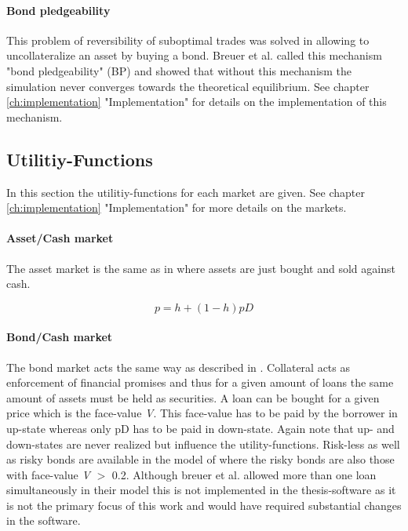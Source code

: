 \documentclass[../Bachelorarbeit.tex]{subfiles}
\begin{document}
\paragraph{Bond pledgeability}
This problem of reversibility of suboptimal trades was solved in allowing to uncollateralize an asset by buying a bond. Breuer et al. called this mechanism "bond pledgeability" (BP) and showed that without this mechanism the simulation never converges towards the theoretical equilibrium. See chapter \ref{ch:implementation} "Implementation" for details on the implementation of this mechanism.

\subsection{Utilitiy-Functions}
In this section the utilitiy-functions for each market are given. See chapter \ref{ch:implementation} "Implementation" for more details on the markets.

\paragraph{Asset/Cash market}
The asset market is the same as in \cite{Geanakoplos2009} where assets are just bought and sold against cash.

\begin{equation}
p = h + ( 1 - h )pD
\end{equation}

\paragraph{Bond/Cash market}
The bond market acts the same way as described in \cite{Geanakoplos2009}. Collateral acts as enforcement of financial promises and thus for a given amount of loans the same amount of assets must be held as securities. A loan can be bought for a given price which is the face-value \textit{V}. This face-value has to be paid by the borrower in up-state whereas only pD has to be paid in down-state. Again note that up- and down-states are never realized but influence the utility-functions.
\medskip
Risk-less as well as risky bonds are available in the model of \cite{Breuer2015} where the risky bonds are also those with face-value \textit{V} $>$ 0.2. Although breuer et al. allowed more than one loan simultaneously in their model this is not implemented in the thesis-software as it is not the primary focus of this work and would have required substantial changes in the software.
\end{document}

